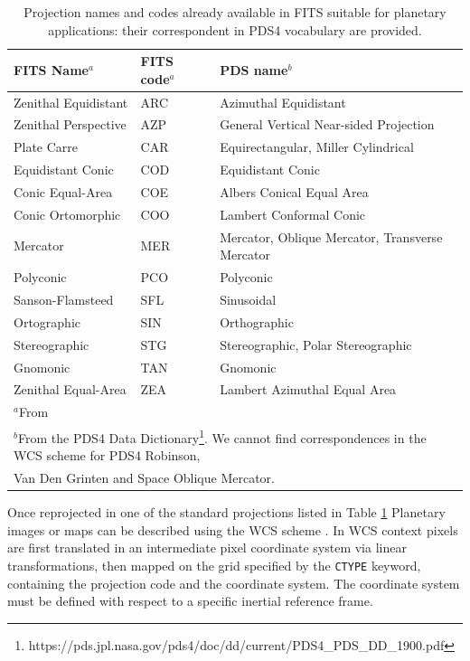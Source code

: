 \begin{table}
\label{table:proj}
\caption{Projection names and codes already available in FITS suitable for
planetary applications: their correspondent in PDS4 vocabulary are
provided.}
\centering
\begin{tabular}{l l l}
\hline
FITS Name$^{a}$ & FITS code$^{a}$ & PDS name$^{b}$ \\ 
\hline
Zenithal Equidistant & ARC & Azimuthal Equidistant \\
Zenithal Perspective & AZP & General Vertical Near-sided Projection \\
Plate Carre & CAR & Equirectangular, Miller Cylindrical \\
Equidistant Conic & COD & Equidistant Conic \\
Conic Equal-Area & COE & Albers Conical Equal Area \\ 
Conic Ortomorphic & COO & Lambert Conformal Conic\\
Mercator & MER & Mercator, Oblique Mercator, Transverse Mercator \\
Polyconic & PCO & Polyconic \\
Sanson-Flamsteed & SFL & Sinusoidal \\
Ortographic & SIN & Orthographic \\
Stereographic & STG & Stereographic, Polar Stereographic \\
Gnomonic & TAN & Gnomonic \\
Zenithal Equal-Area & ZEA & Lambert Azimuthal Equal Area \\
\hline
\multicolumn{3}{l}{$^{a}$From \citet{calagreisenI}} \\
\multicolumn{3}{l}{$^{b}$From the PDS4 Data Dictionary\footnote{https://pds.jpl.nasa.gov/pds4/doc/dd/current/PDS4\_PDS\_DD\_1900.pdf}. We cannot find correspondences in the WCS scheme for PDS4 Robinson,} \\
\multicolumn{3}{l}{Van Den Grinten and Space Oblique Mercator.}
\end{tabular}
\end{table}

Once reprojected in one of the standard projections listed in Table \ref{table:proj}
Planetary images or maps can be described using the WCS scheme
\citep{greisencalaII,calagreisenI}.
In WCS context pixels are first translated in an intermediate pixel coordinate system
via linear transformations, then mapped on the grid specified by the \texttt{CTYPE}
keyword, containing the projection code and the coordinate system.
The coordinate system must be defined with respect to a specific inertial reference frame.

